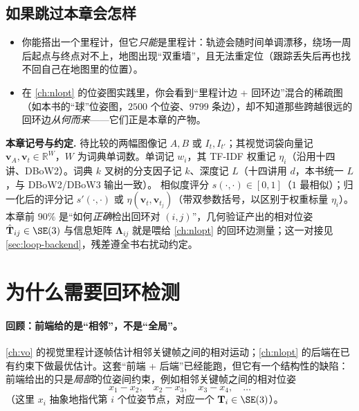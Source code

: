 \subsection*{如果跳过本章会怎样}
\begin{itemize}
  \item 你能搭出一个里程计，但它\emph{只能}是里程计：轨迹会随时间单调漂移，绕场一周后起点与终点对不上，地图出现“双重墙”，且无法重定位（跟踪丢失后再也找不回自己在地图里的位置）。
  \item 在 \cref{ch:nlopt} 的位姿图实践里，你会看到“里程计边 + 回环边”混合的稀疏图（如本书的“球”位姿图，$2500$ 个位姿、$9799$ 条边），却不知道那些跨越很远的回环边\emph{从何而来}——它们正是本章的产物。
\end{itemize}

\begin{note}
\textbf{本章记号与约定.}\;
待比较的两幅图像记 $A,B$ 或 $I_t,I_{t'}$；其视觉词袋向量记 $\boldsymbol v_A,\boldsymbol v_t\in\mathbb{R}^W$，$W$ 为词典单词数。单词记 $w_i$，其 TF-IDF 权重记 $\eta_i$（沿用十四讲\cite{gaoxiang2019slam14}、DBoW2\cite{galvez2012bags}）。词典 $k$ 叉树的分支因子记 $k$、深度记 $L$（十四讲用 $d$，本书统一 $L$，与 DBoW2/DBoW3 输出一致）。
相似度评分 $s(\cdot,\cdot)\in[0,1]$（$1$ 最相似）；归一化后的评分记 $s'(\cdot,\cdot)$ 或 $\eta(\boldsymbol v_t,\boldsymbol v_{t_j})$（带双参数括号，以区别于权重标量 $\eta_i$）。
本章前 $90\%$ 是“如何\emph{正确}检出回环对 $(i,j)$”，几何验证产出的相对位姿 $\hat{\mathbf T}_{ij}\in\SE(3)$ 与信息矩阵 $\boldsymbol\Lambda_{ij}$ 就是喂给 \cref{ch:nlopt} 的回环边测量；这一对接见 \cref{sec:loop-backend}，残差遵全书右扰动约定。
\end{note}

\section{为什么需要回环检测}
\label{sec:loop-why}

\paragraph{回顾：前端给的是“相邻”，不是“全局”。}
\cref{ch:vo} 的视觉里程计逐帧估计相邻关键帧之间的相对运动；\cref{ch:nlopt} 的后端在已有约束下做最优估计。这套“前端 + 后端”已经能跑，但它有一个结构性的缺陷：前端给出的只是\emph{局部}的位姿间约束\cite{gaoxiang2019slam14}，例如相邻关键帧之间的相对位姿
\begin{equation}
  x_1 - x_2,\quad x_2 - x_3,\quad x_3 - x_4,\quad\dots
  \label{eq:loop-odom-chain}
\end{equation}
（这里 $x_i$ 抽象地指代第 $i$ 个位姿节点，对应一个 $\mathbf T_i\in\SE(3)$）。

